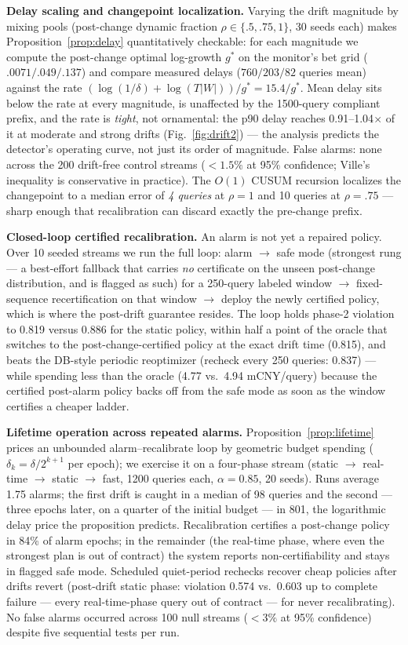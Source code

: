 \textbf{Delay scaling and changepoint localization.} Varying the drift
magnitude by mixing pools (post-change dynamic fraction
$\rho \in \{.5, .75, 1\}$, 30 seeds each) makes
Proposition~\ref{prop:delay} quantitatively checkable: for each
magnitude we compute the post-change optimal log-growth $g^\ast$ on the
monitor's bet grid ($.0071/.049/.137$) and compare measured delays
($760/203/82$ queries mean) against the rate
$(\log(1/\delta) + \log(T|W|))/g^\ast = 15.4/g^\ast$. Mean delay sits
below the rate at every magnitude, is unaffected by the 1500-query
compliant prefix, and the rate is \emph{tight}, not ornamental: the
p90 delay reaches 0.91--1.04$\times$ of it at moderate and strong
drifts (Fig.~\ref{fig:drift2}) --- the analysis predicts the
detector's operating curve, not just its order of magnitude. False
alarms: none across the 200
drift-free control streams ($<1.5\%$ at 95\% confidence; Ville's
inequality is
conservative in practice). The $O(1)$ CUSUM recursion localizes the
changepoint to a median error of \emph{4 queries} at $\rho{=}1$ and 10
queries at $\rho{=}.75$ --- sharp enough that recalibration can discard
exactly the pre-change prefix.

\textbf{Closed-loop certified recalibration.} An alarm is not yet a
repaired policy. Over 10 seeded streams we run the full loop: alarm
$\to$ safe mode (strongest rung --- a best-effort fallback that carries
\emph{no} certificate on the unseen post-change distribution, and is
flagged as such) for a 250-query labeled window $\to$ fixed-sequence
recertification on that window $\to$ deploy the newly certified policy,
which is where the post-drift guarantee resides. The loop holds phase-2
violation to
0.819 versus 0.886 for the static policy, within half a point of the
oracle that switches to the post-change-certified policy at the exact
drift time (0.815), and beats the DB-style periodic reoptimizer
(recheck every 250 queries: 0.837) --- while spending less than the
oracle (4.77 vs.\ 4.94 mCNY/query) because the certified post-alarm
policy backs off from the safe mode as soon as the window certifies a
cheaper ladder.

\textbf{Lifetime operation across repeated alarms.}
Proposition~\ref{prop:lifetime} prices an unbounded alarm--recalibrate
loop by geometric budget spending ($\delta_k = \delta/2^{k+1}$ per
epoch); we exercise it on a four-phase stream (static $\to$ real-time
$\to$ static $\to$ fast, 1200 queries each, $\alpha=0.85$, 20 seeds).
Runs average 1.75 alarms; the first drift is caught in a median of 98
queries and the second --- three epochs later, on a quarter of the
initial budget --- in 801, the logarithmic delay price the proposition
predicts. Recalibration certifies a post-change policy in 84\% of alarm
epochs; in the remainder (the real-time phase, where even the strongest
plan is out of contract) the system reports non-certifiability and
stays in flagged safe mode. Scheduled quiet-period rechecks recover
cheap policies after drifts revert (post-drift static phase: violation
0.574 vs.\ 0.603 up to complete failure --- every real-time-phase
query out of contract --- for never recalibrating). No false alarms
occurred
across 100 null streams ($<3\%$ at 95\% confidence) despite five
sequential tests per run.

